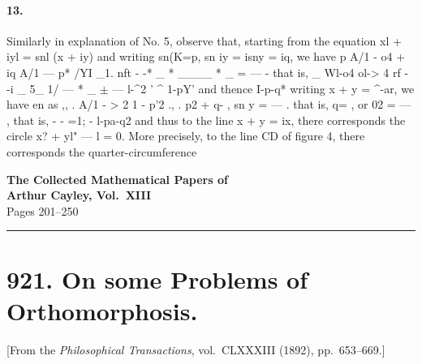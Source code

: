 \documentclass[11pt,a4paper]{book}
\begin{document}
{{{\paragraph{13.} Similarly   in   explanation   of    No.    5,   observe   that,    starting   from    the   equation
xl  +  iyl  =  snl  (x  +  iy)  and  writing  sn(K=p,  sn iy  =  isny  =  iq,  we  have
p  A/1  -  o4  +  iq  A/1  ---  p*
/YI      \_1.  nft      -  -*  \_  *  \_\_\_\_   *   \_  =  ---
-
that  is,
\_
Wl-o4  o\/l-> 4
rf     -  -i  \_  5\_  1/      ---      *  \_  $\pm$  ---
l-^2      '          ^  1-pY'
and  thence
I-p-q*
writing  x  +  y  =  ^-ar,  we  have
en  as     ,,        .  A/1  -  > 2  1  -  p'2  .,        .      p2  +  q-      ,
sn  y  =  ---  .   that   is,  q=  ,  or  02  =  ---         ,  that   is,   -  -      =1;
-  l-pa-q2
and   thus   to   the   line    x  +  y  =  ix,    there    corresponds    the    circle    x?  +  yl"  ---  l  =  0.      More
precisely,   to   the    line    CD   of  figure   4,   there   corresponds   the    quarter-circumference
\clearpage


\begin{center}
{\Large\bfseries The Collected Mathematical Papers of\\[4pt]
Arthur Cayley, Vol.~XIII}\\[12pt]
{\large Pages 201--250}\\[8pt]
\rule{\textwidth}{0.4pt}
\end{center}


\newpage



\section*{921. On some Problems of Orthomorphosis.}

[From the \textit{Philosophical Transactions}, vol.~CLXXXIII (1892), pp.~653--669.]

\bigskip

}}}
\end{document}
